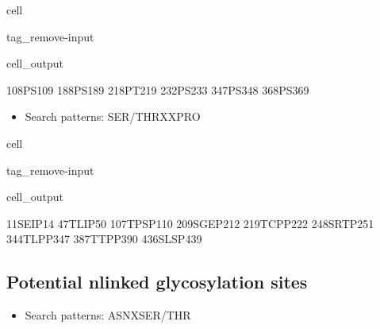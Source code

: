 \documentclass[letterpaper,10pt,english]{jupyterBook}
\begin{document}
\begin{sphinxuseclass}{cell}
\begin{sphinxuseclass}{tag_remove-input}\begin{sphinxVerbatimOutput}

\begin{sphinxuseclass}{cell_output}
\begin{sphinxVerbatim}[commandchars=\\\{\}]
108\PYGZhy{}PS\PYGZhy{}109
188\PYGZhy{}PS\PYGZhy{}189
218\PYGZhy{}PT\PYGZhy{}219
232\PYGZhy{}PS\PYGZhy{}233
347\PYGZhy{}PS\PYGZhy{}348
368\PYGZhy{}PS\PYGZhy{}369
\end{sphinxVerbatim}

\end{sphinxuseclass}\end{sphinxVerbatimOutput}

\end{sphinxuseclass}
\end{sphinxuseclass}\begin{itemize}
\item {} 
\sphinxAtStartPar
Search patterns: SER/THR\sphinxhyphen{}X\sphinxhyphen{}X\sphinxhyphen{}PRO

\end{itemize}

\begin{sphinxuseclass}{cell}
\begin{sphinxuseclass}{tag_remove-input}\begin{sphinxVerbatimOutput}

\begin{sphinxuseclass}{cell_output}
\begin{sphinxVerbatim}[commandchars=\\\{\}]
11\PYGZhy{}SEIP\PYGZhy{}14
47\PYGZhy{}TLIP\PYGZhy{}50
107\PYGZhy{}TPSP\PYGZhy{}110
209\PYGZhy{}SGEP\PYGZhy{}212
219\PYGZhy{}TCPP\PYGZhy{}222
248\PYGZhy{}SRTP\PYGZhy{}251
344\PYGZhy{}TLPP\PYGZhy{}347
387\PYGZhy{}TTPP\PYGZhy{}390
436\PYGZhy{}SLSP\PYGZhy{}439
\end{sphinxVerbatim}

\end{sphinxuseclass}\end{sphinxVerbatimOutput}

\end{sphinxuseclass}
\end{sphinxuseclass}

\subsection{Potential n\sphinxhyphen{}linked glycosylation sites}
\label{\detokenize{ipynb/chapter1:potential-n-linked-glycosylation-sites}}\begin{itemize}
\item {} 
\sphinxAtStartPar
Search patterns: ASN\sphinxhyphen{}X\sphinxhyphen{}SER/THR

\end{itemize}
\end{document}
